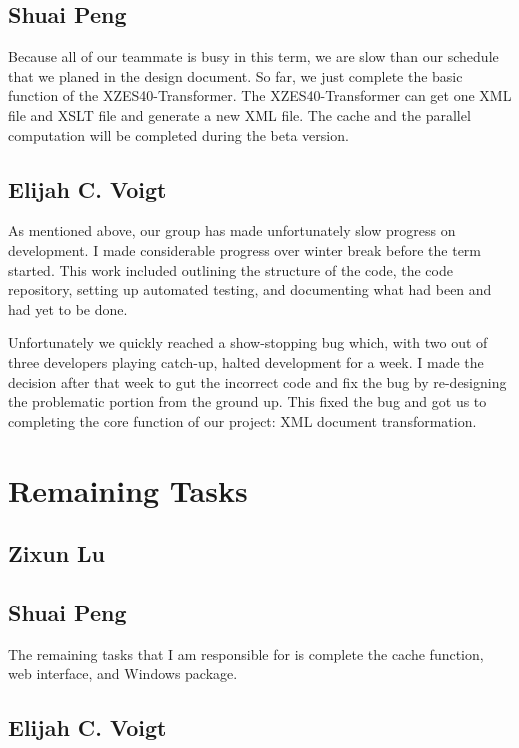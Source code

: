 \subsection{Shuai Peng}

Because all of our teammate is busy in this term, we are slow than our schedule that we planed in the design document. 
So far, we just complete the basic function of the XZES40-Transformer.
The XZES40-Transformer can get one XML file and XSLT file and generate a new XML file.
The cache and the parallel computation will be completed during the beta version.  

\subsection{Elijah C. Voigt}

As mentioned above, our group has made unfortunately slow progress on development.
I made considerable progress over winter break before the term started.
This work included outlining the structure of the code, the code repository, setting up automated testing, and documenting what had been and had yet to be done.

Unfortunately we quickly reached a show-stopping bug which, with two out of three developers playing catch-up, halted development for a week.
I made the decision after that week to gut the incorrect code and fix the bug by re-designing the problematic portion from the ground up.
This fixed the bug and got us to completing the core function of our project: XML document transformation.

\section{Remaining Tasks}

\subsection{Zixun Lu}

\subsection{Shuai Peng}

The remaining tasks that I am responsible for is complete the cache function, web interface, and Windows package.

\subsection{Elijah C. Voigt}

